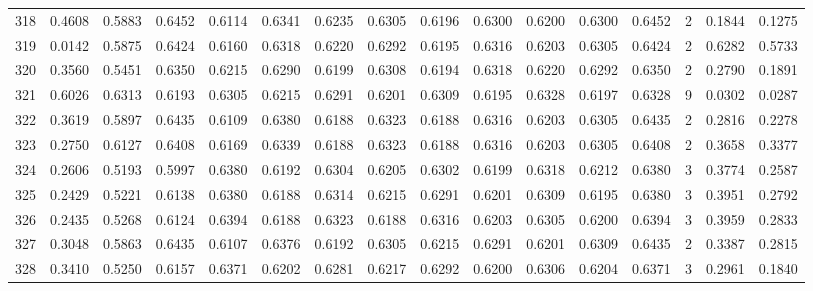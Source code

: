 \begin{tabular}{lrrrrrrrrrrrrrrr}
318 &      0.4608 &  0.5883 &  0.6452 &  0.6114 &  0.6341 &  0.6235 &  0.6305 &  0.6196 &  0.6300 &  0.6200 &   0.6300 &     0.6452 &      2 &                    0.1844 &                     0.1275 \\
319 &      0.0142 &  0.5875 &  0.6424 &  0.6160 &  0.6318 &  0.6220 &  0.6292 &  0.6195 &  0.6316 &  0.6203 &   0.6305 &     0.6424 &      2 &                    0.6282 &                     0.5733 \\
320 &      0.3560 &  0.5451 &  0.6350 &  0.6215 &  0.6290 &  0.6199 &  0.6308 &  0.6194 &  0.6318 &  0.6220 &   0.6292 &     0.6350 &      2 &                    0.2790 &                     0.1891 \\
321 &      0.6026 &  0.6313 &  0.6193 &  0.6305 &  0.6215 &  0.6291 &  0.6201 &  0.6309 &  0.6195 &  0.6328 &   0.6197 &     0.6328 &      9 &                    0.0302 &                     0.0287 \\
322 &      0.3619 &  0.5897 &  0.6435 &  0.6109 &  0.6380 &  0.6188 &  0.6323 &  0.6188 &  0.6316 &  0.6203 &   0.6305 &     0.6435 &      2 &                    0.2816 &                     0.2278 \\
323 &      0.2750 &  0.6127 &  0.6408 &  0.6169 &  0.6339 &  0.6188 &  0.6323 &  0.6188 &  0.6316 &  0.6203 &   0.6305 &     0.6408 &      2 &                    0.3658 &                     0.3377 \\
324 &      0.2606 &  0.5193 &  0.5997 &  0.6380 &  0.6192 &  0.6304 &  0.6205 &  0.6302 &  0.6199 &  0.6318 &   0.6212 &     0.6380 &      3 &                    0.3774 &                     0.2587 \\
325 &      0.2429 &  0.5221 &  0.6138 &  0.6380 &  0.6188 &  0.6314 &  0.6215 &  0.6291 &  0.6201 &  0.6309 &   0.6195 &     0.6380 &      3 &                    0.3951 &                     0.2792 \\
326 &      0.2435 &  0.5268 &  0.6124 &  0.6394 &  0.6188 &  0.6323 &  0.6188 &  0.6316 &  0.6203 &  0.6305 &   0.6200 &     0.6394 &      3 &                    0.3959 &                     0.2833 \\
327 &      0.3048 &  0.5863 &  0.6435 &  0.6107 &  0.6376 &  0.6192 &  0.6305 &  0.6215 &  0.6291 &  0.6201 &   0.6309 &     0.6435 &      2 &                    0.3387 &                     0.2815 \\
328 &      0.3410 &  0.5250 &  0.6157 &  0.6371 &  0.6202 &  0.6281 &  0.6217 &  0.6292 &  0.6200 &  0.6306 &   0.6204 &     0.6371 &      3 &                    0.2961 &                     0.1840 \\

\end{tabular}
